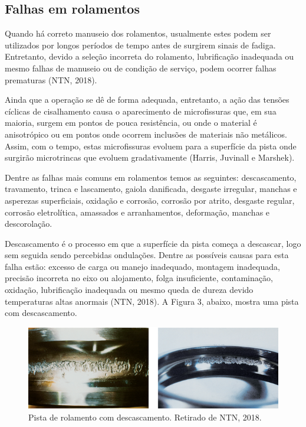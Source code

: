 \documentclass[
	12pt,				
	oneside,			
	a4paper,			
	english,			
	brazil				
	]{abntex2ppgsi}
\begin{document}
\subsection{\textbf{Falhas em rolamentos}}

Quando há correto manuseio dos rolamentos, usualmente estes podem ser utilizados por longos períodos de tempo antes de surgirem sinais de fadiga. Entretanto, devido a seleção incorreta do rolamento, lubrificação inadequada ou mesmo falhas de manuseio ou de condição de serviço, podem ocorrer falhas prematuras (NTN, 2018).

Ainda que a operação se dê de forma adequada, entretanto, a ação das tensões cíclicas de cisalhamento causa o aparecimento de microfissuras que, em sua maioria, surgem em pontos de pouca resistência, ou onde o material é anisotrópico  ou em pontos onde ocorrem inclusões de materiais não metálicos. Assim, com o tempo, estas microfissuras evoluem para a superfície da pista onde surgirão microtrincas que evoluem gradativamente (Harris, Juvinall e Marshek).

Dentre as falhas mais comuns em rolamentos temos as seguintes: descascamento, travamento, trinca e lascamento, gaiola danificada, desgaste irregular, manchas e asperezas superficiais, oxidação e corrosão, corrosão por atrito, desgaste regular, corrosão eletrolítica, amassados e arranhamentos, deformação, manchas e descorolação.

Descascamento é o processo em que a superfície da pista começa a descascar, logo sem seguida sendo percebidas ondulações. Dentre as possíveis causas para esta falha estão: excesso de carga ou manejo inadequado, montagem inadequada, precisão incorreta no eixo ou alojamento, folga insuficiente, contaminação, oxidação, lubrificação inadequada ou mesmo queda de dureza devido temperaturas altas anormais (NTN, 2018). A Figura 3, abaixo, mostra uma pista com descascamento.

\begin{figure}[!htb]
\centering
\includegraphics{Figura3}
\caption {Pista de rolamento com descascamento. Retirado de NTN, 2018.}
\label{Figura3}
\end{figure}
\end{document}
